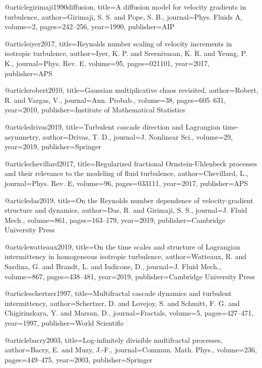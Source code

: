 @article{girimaji1990diffusion,
  title={{A diffusion model for velocity gradients in turbulence}},
  author={Girimaji, S. S. and Pope, S. B.},
  journal={Phys. Fluids A},
  volume={2},
  pages={242--256},
  year={1990},
  publisher={AIP}
}

@article{iyer2017,
  title={{Reynolds number scaling of velocity increments in isotropic turbulence}},
  author={Iyer, K. P. and Sreenivasan, K. R. and Yeung, P. K.},
  journal={Phys. Rev. E},
  volume={95},
  pages={021101},
  year={2017},
  publisher={APS}
}

@article{robert2010,
  title={{Gaussian multiplicative chaos revisited}},
  author={Robert, R. and Vargas, V.},
  journal={Ann. Probab.},
  volume={38},
  pages={605--631},
  year={2010},
  publisher={Institute of Mathematical Statistics}
}

@article{drivas2019,
  title={{Turbulent cascade direction and Lagrangian time-asymmetry}},
  author={Drivas, T. D.},
  journal={J. Nonlinear Sci.},
  volume={29},
  year={2019},
  publisher={Springer}
}

@article{chevillard2017,
  title={{Regularized fractional Ornstein-Uhlenbeck processes and their relevance to the modeling of fluid turbulence}},
  author={Chevillard, L.},
  journal={Phys. Rev. E},
  volume={96},
  pages={033111},
  year={2017},
  publisher={APS}
}

@article{das2019,
  title={{On the Reynolds number dependence of velocity-gradient structure and dynamics}},
  author={Das, R. and Girimaji, S. S.},
  journal={J. Fluid Mech.},
  volume={861},
  pages={163--179},
  year={2019},
  publisher={Cambridge University Press}
}

@article{watteaux2019,
  title={{On the time scales and structure of Lagrangian intermittency in homogeneous isotropic turbulence}},
  author={Watteaux, R. and Sardina, G. and Brandt, L. and Iudicone, D.},
  journal={J. Fluid Mech.},
  volume={867},
  pages={438--481},
  year={2019},
  publisher={Cambridge University Press}
}

@article{schertzer1997,
  title={{Multifractal cascade dynamics and turbulent intermittency}},
  author={Schertzer, D. and Lovejoy, S. and Schmitt, F. G. and Chigirinskaya, Y. and Marsan, D.},
  journal={Fractals},
  volume={5},
  pages={427--471},
  year={1997},
  publisher={World Scientific}
}

@article{bacry2003,
  title={{Log-infinitely divisible multifractal processes}},
  author={Bacry, E. and Muzy, J.-F.},
  journal={Commun. Math. Phys.},
  volume={236},
  pages={449--475},
  year={2003},
  publisher={Springer}
}


